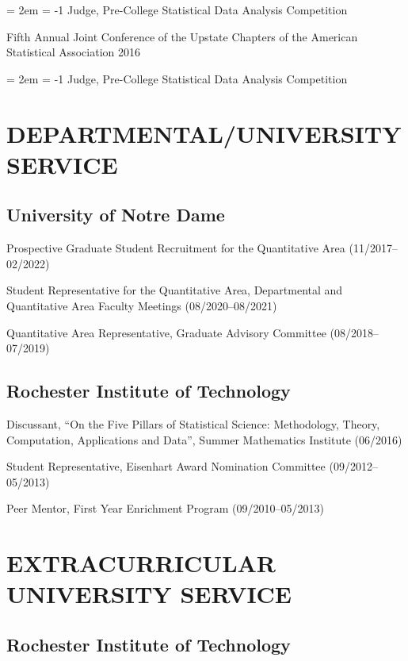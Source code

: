 \documentclass[
  12 pt,
]{article}
\begin{document}
\hangindent = 2em \hangafter = -1 Judge, Pre-College Statistical Data
Analysis Competition

Fifth Annual Joint Conference of the Upstate Chapters of the American
Statistical Association \hfill 2016

\hangindent = 2em \hangafter = -1 Judge, Pre-College Statistical Data
Analysis Competition

\hypertarget{departmentaluniversity-service}{%
\section{DEPARTMENTAL/UNIVERSITY
SERVICE}\label{departmentaluniversity-service}}

\hypertarget{university-of-notre-dame-1}{%
\subsection{University of Notre Dame}\label{university-of-notre-dame-1}}

Prospective Graduate Student Recruitment for the Quantitative Area
(11/2017--02/2022)

Student Representative for the Quantitative Area, Departmental and
Quantitative Area Faculty Meetings (08/2020--08/2021)

Quantitative Area Representative, Graduate Advisory Committee
(08/2018--07/2019)

\hypertarget{rochester-institute-of-technology-1}{%
\subsection{Rochester Institute of
Technology}\label{rochester-institute-of-technology-1}}

Discussant, ``On the Five Pillars of Statistical Science: Methodology,
Theory, Computation, Applications and Data'', Summer Mathematics
Institute (06/2016)

Student Representative, Eisenhart Award Nomination Committee
(09/2012--05/2013)

Peer Mentor, First Year Enrichment Program (09/2010--05/2013)

\hypertarget{extracurricular-university-service}{%
\section{EXTRACURRICULAR UNIVERSITY
SERVICE}\label{extracurricular-university-service}}

\hypertarget{rochester-institute-of-technology-2}{%
\subsection{Rochester Institute of
Technology}\label{rochester-institute-of-technology-2}}
\end{document}
